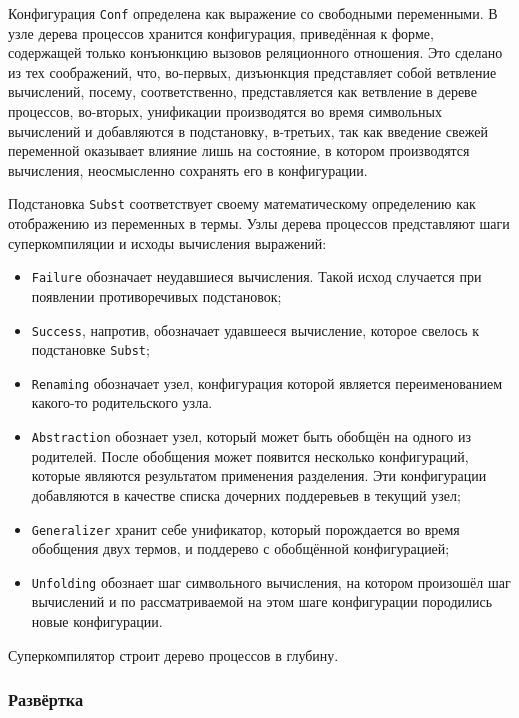 Конфигурация \lstinline{Conf} определена как выражение со свободными переменными.
В узле дерева процессов хранится конфигурация, приведённая к форме, содержащей только конъюнкцию вызовов
реляционного отношения. Это сделано из тех соображений, что, во-первых, дизъюнкция представляет
собой ветвление вычислений, посему, соответственно, представляется как ветвление в дереве процессов,
во-вторых, унификации производятся во время символьных вычислений и добавляются в подстановку,
в-третьих, так как введение свежей переменной оказывает влияние лишь на состояние, в котором производятся вычисления,
неосмысленно сохранять его в конфигурации.

Подстановка \lstinline{Subst} соответствует своему математическому определению
как отображению из переменных в термы.
Узлы дерева процессов представляют шаги суперкомпиляции и исходы вычисления выражений:
\begin{itemize}
\item \lstinline{Failure} обозначает неудавшиеся вычисления. Такой исход
      случается при появлении противоречивых подстановок;
\item \lstinline{Success}, напротив, обозначает удавшееся вычисление, которое свелось к подстановке \lstinline{Subst};
\item \lstinline{Renaming} обозначает узел, конфигурация которой является переименованием какого-то родительского узла.
\item \lstinline{Abstraction} обознает узел, который может быть обобщён на одного из
      родителей. После обобщения может появится несколько конфигураций, которые являются
      результатом применения разделения. Эти конфигурации добавляются в качестве списка
      дочерних поддеревьев в текущий узел;
\item \lstinline{Generalizer} хранит себе унификатор, который порождается во время обобщения
      двух термов, и поддерево с обобщённой конфигурацией;
\item \lstinline{Unfolding} обознает шаг символьного вычисления, на котором произошёл шаг вычислений
      и по рассматриваемой на этом шаге конфигурации породились новые конфигурации.
\end{itemize}

Суперкомпилятор строит дерево процессов в глубину. 

\subsubsection{Развёртка}

